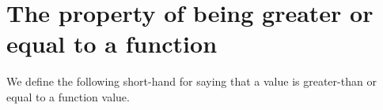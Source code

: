 \begin{fence}
\begin{code}
\AgdaSymbol{;}\AgdaSpace{}%
\AgdaSymbol{;}\AgdaSpace{}%
\AgdaSymbol{;}\AgdaSpace{}%
\AgdaSymbol{;}\<%
\\
\>[102I][@{}l@{\AgdaIndent{0}}]%
\>[12]\AgdaSymbol{;}\AgdaSpace{}%
\AgdaSymbol{;}\AgdaSpace{}%
\AgdaSymbol{;}\AgdaSpace{}%
\AgdaSymbol{;}\AgdaSpace{}%
\AgdaSymbol{;}\AgdaSpace{}%
\AgdaSymbol{;}\AgdaSpace{}%
\AgdaSymbol{;}\AgdaSpace{}%
\AgdaSymbol{;}\AgdaSpace{}%
\AgdaSymbol{;}\<%
\\
%
\>[12]\AgdaSymbol{;}\AgdaSpace{}%
\AgdaSymbol{;}\AgdaSpace{}%
\AgdaSymbol{;}\AgdaSpace{}%
\AgdaSymbol{;}\AgdaSpace{}%
\AgdaSymbol{;}\AgdaSpace{}%
\AgdaSymbol{;}\AgdaSpace{}%
\AgdaSymbol{;}\AgdaSpace{}%
\AgdaSymbol{;}\<%
\\
%
\>[12]\AgdaSymbol{)}\<%
\\
\>[0]\AgdaSpace{}%
\AgdaSpace{}%
\AgdaSpace{}%
\AgdaSpace{}%
\AgdaSymbol{(}\AgdaSymbol{)}\<%
\\
\>[0]\<%
\end{code}
\end{fence}

\hypertarget{the-property-of-being-greater-or-equal-to-a-function}{%
\section{The property of being greater or equal to a
function}\label{the-property-of-being-greater-or-equal-to-a-function}}

We define the following short-hand for saying that a value is
greater-than or equal to a function value.

